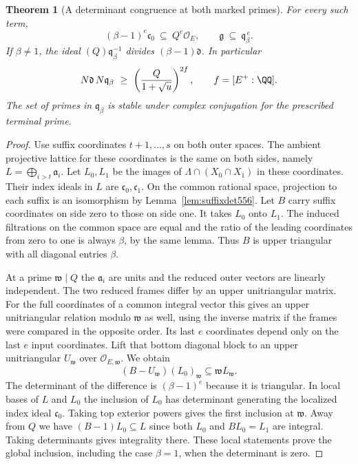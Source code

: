 \documentclass[a4paper,11pt]{article}
\newtheorem{theorem}[proposition]{Theorem}
\theoremstyle{definition}
\theoremstyle{remark}
\numberwithin{equation}{section}
\begin{document}
\begin{theorem}[A determinant congruence at both marked primes]
\leavevmode\label{thm:markedindex564}
For every such term,
\[
       (\beta-1)^e\mathfrak c_0\ \subseteq\ Q^e\mathcal O_E,
                  \qquad
       \mathfrak g\ \subseteq\ \mathfrak q_\beta^{\,e}.
\]
If \(\beta\ne1\), the ideal \((Q)\mathfrak q_\beta^{-1}\)
divides \((\beta-1)\mathfrak d\). In particular
\[
             N\mathfrak d\,N\mathfrak q_\beta
                   \ \ge\ \left(\frac{Q}{1+\sqrt u}\right)^{2f},
             \qquad f=[E^+:\QQ].
\]
The set of primes in \(\mathfrak q_\beta\) is stable under complex
conjugation for the prescribed terminal prime.
\end{theorem}
\begin{proof}
Use suffix coordinates \(t+1,\ldots,s\) on both outer spaces.
The ambient projective lattice for these coordinates is the same
on both sides, namely \(L=\bigoplus_{i>t}\mathfrak a_i\).
Let \(L_0,L_1\) be the images of \(\Lambda\cap(X_0\cap X_1)\)
in these coordinates. Their index ideals in \(L\) are
\(\mathfrak c_0,\mathfrak c_1\). On the common rational space,
projection to each suffix is an isomorphism by
Lemma~\ref{lem:suffixdet556}. Let \(B\) carry suffix coordinates
on side zero to those on side one. It takes \(L_0\) onto \(L_1\).
The induced filtrations on the common space are equal and the
ratio of the leading coordinates from zero to one is always
\(\beta\), by the same lemma. Thus \(B\) is upper triangular
with all diagonal entries \(\beta\).

At a prime \(\mathfrak w\mid Q\) the \(\mathfrak a_i\) are
units and the reduced outer vectors are linearly independent.
The two reduced frames differ by an upper unitriangular matrix.
For the full coordinates of a common integral vector this gives
an upper unitriangular relation modulo \(\mathfrak w\) as well,
using the inverse matrix if the frames were compared in the opposite
order. Its last \(e\) coordinates depend only on the last \(e\)
input coordinates. Lift that bottom diagonal block to an upper
unitriangular \(U_{\mathfrak w}\) over \(\mathcal O_{E,\mathfrak w}\).
We obtain
\[
       (B-U_{\mathfrak w})(L_0)_{\mathfrak w}
                            \subseteq \mathfrak w L_{\mathfrak w}.
\]
The determinant of the difference is \((\beta-1)^e\) because
it is triangular. In local bases of \(L\) and \(L_0\) the
inclusion of \(L_0\) has determinant generating the localized
index ideal \(\mathfrak c_0\). Taking top exterior powers gives
the first inclusion at \(\mathfrak w\). Away from \(Q\) we have
\((B-1)L_0\subseteq L\) since both \(L_0\) and \(B L_0=L_1\)
are integral. Taking determinants gives integrality there. These
local statements prove the global inclusion, including the
case \(\beta=1\), when the determinant is zero.


\end{proof}
\end{document}
